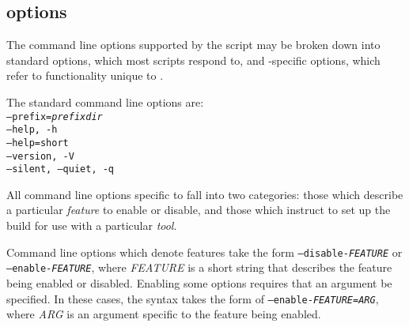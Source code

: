 \subsection{\configure options}
\label{sec:configure-options}


The command line options supported by the \configure script
may be broken down into standard options, which most \configure scripts
respond to, and \libflamens-specific options, which refer to functionality
unique to \libflamens.

The standard command line options are: \\

\noindent
{\tt --prefix={\em prefixdir}} \\
\noindent
{\tt --help, -h} \\
\noindent
{\tt --help=short} \\
\noindent
{\tt --version, -V} \\
\noindent
{\tt --silent, --quiet, -q} \\

All command line options specific to \libflame fall into two categories:
those which describe a particular {\em feature} to enable or disable,
and those which instruct \configure to set up the build for use with a
particular {\em tool}.

Command line options which denote features take the form
{\tt --disable-{\em FEATURE}} or
{\tt --enable-{\em FEATURE}}, where {\em FEATURE} is a short string that
describes the feature being enabled or disabled.
Enabling some options requires that an argument be specified.
In these cases, the syntax takes the form of
{\tt --enable-{\em FEATURE}={\em ARG}}, where {\em ARG} is an argument
specific to the feature being enabled.

